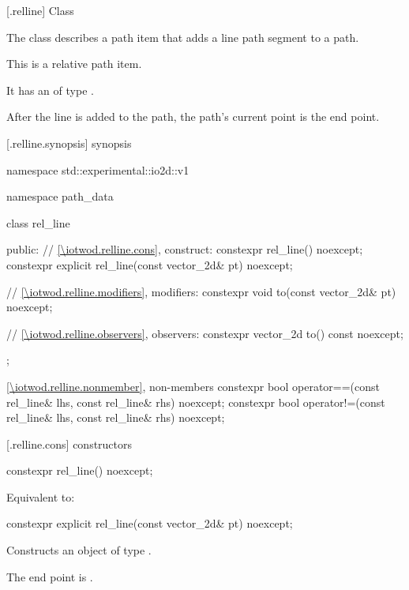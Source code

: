  [\iotwod.relline] {Class }

\pnum
{}%
The class  describes a path item that adds a line path segment to a path.

\pnum
This is a relative path item.

\pnum
It has an  of type .

\pnum
After the line is added to the path, the path's current point is the end point.

 [\iotwod.relline.synopsis] { synopsis}

\begin{codeblock}
namespace std::experimental::io2d::v1 {
  namespace path_data {
    class rel_line {
    public:
      // \ref{\iotwod.relline.cons}, construct:
      constexpr rel_line() noexcept;
      constexpr explicit rel_line(const vector_2d& pt) noexcept;

      // \ref{\iotwod.relline.modifiers}, modifiers:
      constexpr void to(const vector_2d& pt) noexcept;

      // \ref{\iotwod.relline.observers}, observers:
      constexpr vector_2d to() const noexcept;
    };
    
    \ref{\iotwod.relline.nonmember}, non-members
    constexpr bool operator==(const rel_line& lhs, const rel_line& rhs) 
      noexcept;
    constexpr bool operator!=(const rel_line& lhs, const rel_line& rhs) 
      noexcept;
  }
}
\end{codeblock}

 [\iotwod.relline.cons] { constructors}

%
\begin{itemdecl}
constexpr rel_line() noexcept;
\end{itemdecl}
\begin{itemdescr}
\pnum
\effects
Equivalent to: 
\end{itemdescr}

%
\begin{itemdecl}
constexpr explicit rel_line(const vector_2d& pt) noexcept;
\end{itemdecl}
\begin{itemdescr}
\pnum
\effects
Constructs an object of type .

\pnum
The end point is .
\end{itemdescr}

